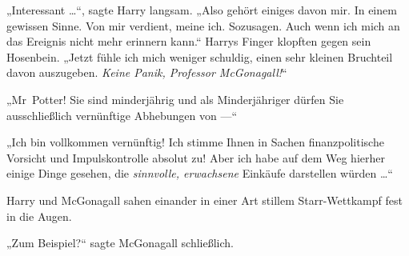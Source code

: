 „Interessant …“, sagte Harry langsam.
„Also gehört einiges davon mir. In einem gewissen Sinne. Von mir verdient, meine ich. Sozusagen. Auch wenn ich mich an das Ereignis nicht mehr erinnern kann.“ Harrys Finger klopften gegen sein Hosenbein.
„Jetzt fühle ich mich weniger schuldig, einen sehr kleinen Bruchteil davon auszugeben. \emph{Keine Panik, Professor McGonagall!}“

„Mr~Potter! Sie sind minderjährig und als Minderjähriger dürfen Sie ausschließlich vernünftige Abhebungen von —“

„Ich bin vollkommen vernünftig! Ich stimme Ihnen in Sachen finanzpolitische Vorsicht und Impulskontrolle absolut zu! Aber ich habe auf dem Weg hierher einige Dinge gesehen, die \emph{sinnvolle, erwachsene} Einkäufe darstellen würden …“

Harry und McGonagall sahen einander in einer Art stillem Starr-Wettkampf fest in die Augen.

„Zum Beispiel?“ sagte McGonagall schließlich.

